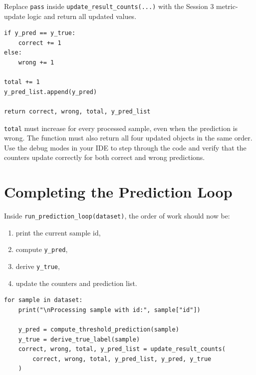 \begin{tcolorbox}[title=Task 7: Update prediction counts and save results]
Replace \texttt{pass} inside \texttt{update\_result\_counts(...)} with the Session 3 metric-update logic and return all updated values.
\end{tcolorbox}

\begin{verbatim}
if y_pred == y_true:
    correct += 1
else:
    wrong += 1

total += 1
y_pred_list.append(y_pred)

return correct, wrong, total, y_pred_list
\end{verbatim}

\begin{tcolorbox}[title=Checkpoint]
\texttt{total} must increase for every processed sample, even when the prediction is wrong. The function must also return all four updated objects in the same order.
Use the debug modes in your IDE to step through the code and verify that the counters update correctly for both correct and wrong predictions.
\end{tcolorbox}

\section{Completing the Prediction Loop}

Inside \texttt{run\_prediction\_loop(dataset)}, the order of work should now be:
\begin{enumerate}
    \item print the current sample id,
    \item compute \texttt{y\_pred},
    \item derive \texttt{y\_true},
    \item update the counters and prediction list.
\end{enumerate}

\begin{verbatim}
for sample in dataset:
    print("\nProcessing sample with id:", sample["id"])

    y_pred = compute_threshold_prediction(sample)
    y_true = derive_true_label(sample)
    correct, wrong, total, y_pred_list = update_result_counts(
        correct, wrong, total, y_pred_list, y_pred, y_true
    )
\end{verbatim}


